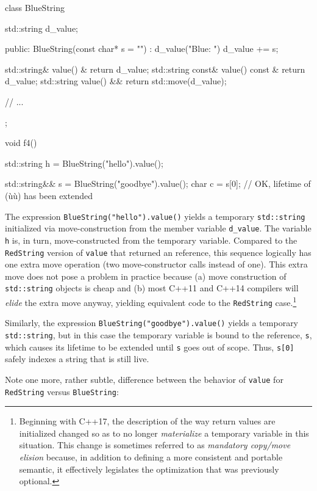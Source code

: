 \begin{emcppslisting}
class BlueString
{
   std::string d_value;

public:
    BlueString(const char* s = "") : d_value("Blue: ") { d_value += s; }

    std::string&        value() &       { return d_value; }
    std::string const&  value() const & { return d_value; }
    std::string         value() &&      { return std::move(d_value); }

    // ...
};

void f4()
{
    std::string h = BlueString("hello").value();

    std::string&& s = BlueString("goodbye").value();
    char c = s[0];  // OK, lifetime of (ù{}ù) has been extended
}
\end{emcppslisting}
    

\noindent The expression \lstinline!BlueString("hello").value()! yields a temporary
\lstinline!std::string! initialized via move-construction from the member
variable \lstinline!d_value!. The variable \lstinline!h! is, in turn,
move-constructed from the temporary variable. Compared to the
\lstinline!RedString! version of \lstinline!value! that returned an
 reference, this sequence logically has one extra move
operation (two move-constructor calls instead of one). This extra move
does not pose a problem in practice because (a) move construction of
\lstinline!std::string! objects is cheap and (b) most C++11 and C++14
compilers will \emph{elide} the extra move anyway, yielding equivalent
code to the \lstinline!RedString! case.{\cprotect\footnote{Beginning with
C++17, the description of the way return values are initialized
changed so as to no longer \emph{materialize} a temporary variable in
this situation. This change is sometimes referred to as
\emph{mandatory copy/move elision} because, in addition to defining a
more consistent and portable semantic, it effectively legislates the
  optimization that was previously optional.}}

Similarly, the expression \lstinline!BlueString("goodbye").value()! yields
a temporary \lstinline!std::string!, but in this case the temporary
variable is bound to the reference, \lstinline!s!, which causes its
lifetime to be extended until \lstinline!s! goes out of scope. Thus,
\lstinline!s[0]! safely indexes a string that is still live.

Note one more, rather subtle, difference between the behavior of
\lstinline!value! for \lstinline!RedString! versus \lstinline!BlueString!:

